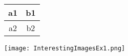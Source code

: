 \documentclass{article}
\begin{document}
\usepackage{graphicx}
\graphicspath{ {./images} }

\begin{tabular}{|c|c|}
\hline
a1 & b1 \\
\hline
a2 & b2 \\
\hline
\end{tabular}
\texttt{[image: InterestingImagesEx1.png]}
\end{document}
